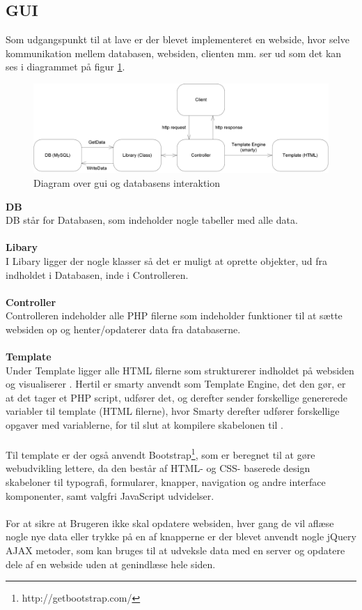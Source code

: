 \subsection{GUI}
Som udgangspunkt til at lave  er der blevet implementeret en webside, hvor selve kommunikation mellem databasen, websiden, clienten mm. ser ud som det kan ses i diagrammet på figur \ref{fig:web}.

\begin{figure}[H]
    \centering
    \includegraphics[width=.9\textwidth]{SoftwareArkitektur/GUI/Intro_GUI_DB/photo/webDiagram.PNG}
    \caption{Diagram over gui og databasens interaktion}
    \label{fig:web}
\end{figure}
\textbf{DB}\\
DB står for Databasen, som indeholder nogle tabeller med alle data.
\\\\
\textbf{Libary}\\
I Libary ligger der nogle klasser så det er muligt at oprette objekter, ud fra indholdet i Databasen, inde i Controlleren. 
\\\\
\textbf{Controller}\\
Controlleren indeholder alle PHP filerne som indeholder funktioner til at sætte websiden op og henter/opdaterer data fra databaserne.
\\\\
\textbf{Template}\\
Under Template ligger alle HTML filerne som strukturerer indholdet på websiden og visualiserer . Hertil er smarty anvendt som Template Engine, det den gør, er at det tager et PHP script, udfører det, og derefter sender forskellige genererede variabler til template (HTML filerne), hvor Smarty derefter udfører forskellige opgaver med variablerne, for til slut at kompilere skabelonen til .
\\\\
Til template er der også anvendt Bootstrap\footnote{http://getbootstrap.com/}, som er beregnet til at gøre webudvikling lettere, da den består af HTML- og CSS- baserede design skabeloner til typografi, formularer, knapper, navigation og andre interface komponenter, samt valgfri JavaScript udvidelser.
\\\\
For at sikre at Brugeren ikke skal opdatere websiden, hver gang de vil aflæse nogle nye data eller trykke på en af knapperne er der blevet anvendt nogle jQuery AJAX metoder, som kan bruges til at udveksle data med en server og opdatere dele af en webside uden at genindlæse hele siden.

